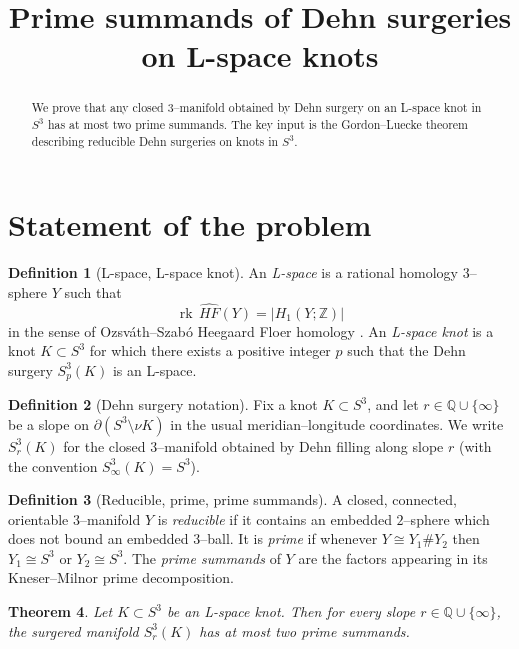 \documentclass[11pt]{article}
\newtheorem{theorem}{Theorem}[section]
\theoremstyle{definition}
\newtheorem{definition}[theorem]{Definition}
\begin{document}
\title{Prime summands of Dehn surgeries on L-space knots}
\date{}
\maketitle

\begin{abstract}
We prove that any closed $3$--manifold obtained by Dehn surgery on an L-space knot in $S^3$ has at most two prime summands. The key input is the Gordon--Luecke theorem describing reducible Dehn surgeries on knots in $S^3$.
\end{abstract}

\section{Statement of the problem}

\begin{definition}[L-space, L-space knot]
An \emph{L-space} is a rational homology $3$--sphere $Y$ such that
\[
\operatorname{rk}\,\widehat{HF}(Y)=|H_1(Y;\mathbb{Z})|
\]
in the sense of Ozsv\'ath--Szab\'o Heegaard Floer homology \cite{OS04}.
An \emph{L-space knot} is a knot $K\subset S^3$ for which there exists a positive integer $p$ such that the Dehn surgery $S^3_p(K)$ is an L-space.
\end{definition}

\begin{definition}[Dehn surgery notation]
Fix a knot $K\subset S^3$, and let $r\in\mathbb{Q}\cup\{\infty\}$ be a slope on $\partial(S^3\setminus \nu K)$ in the usual meridian--longitude coordinates.
We write $S^3_r(K)$ for the closed $3$--manifold obtained by Dehn filling along slope $r$ (with the convention $S^3_\infty(K)=S^3$).
\end{definition}

\begin{definition}[Reducible, prime, prime summands]
A closed, connected, orientable $3$--manifold $Y$ is \emph{reducible} if it contains an embedded $2$--sphere which does not bound an embedded $3$--ball.
It is \emph{prime} if whenever $Y\cong Y_1\# Y_2$ then $Y_1\cong S^3$ or $Y_2\cong S^3$.
The \emph{prime summands} of $Y$ are the factors appearing in its Kneser--Milnor prime decomposition.
\end{definition}

\begin{theorem}\label{thm:main}
Let $K\subset S^3$ be an L-space knot. Then for every slope $r\in\mathbb{Q}\cup\{\infty\}$, the surgered manifold $S^3_r(K)$ has at most two prime summands.
\end{theorem}
\end{document}
